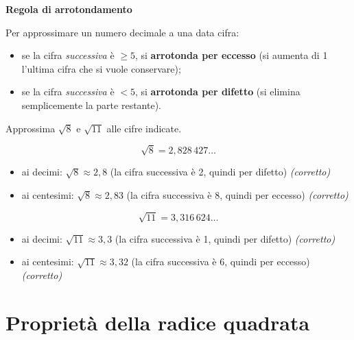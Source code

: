 \begin{regola}
    \textbf{Regola di arrotondamento}

    Per approssimare un numero decimale a una data cifra:
    \begin{itemize}
        \item se la cifra \emph{successiva} è \(\geq 5\), si \textbf{arrotonda per eccesso}
              (si aumenta di 1 l'ultima cifra che si vuole conservare);
        \item se la cifra \emph{successiva} è \(< 5\), si \textbf{arrotonda per difetto}
              (si elimina semplicemente la parte restante).
    \end{itemize}
\end{regola}

\begin{esempio}
    Approssima \(\sqrt{8}\) e \(\sqrt{11}\) alle cifre indicate.

    \[
        \sqrt{8} = 2{,}828\,427\ldots
    \]
    \begin{itemize}
        \item ai decimi: \(\sqrt{8} \approx 2{,}8\) \quad
              (la cifra successiva è 2, quindi per difetto) \quad \textit{(corretto)}
        \item ai centesimi: \(\sqrt{8} \approx 2{,}83\) \quad
              (la cifra successiva è 8, quindi per eccesso) \quad \textit{(corretto)}
    \end{itemize}

    \[
        \sqrt{11} = 3{,}316\,624\ldots
    \]
    \begin{itemize}
        \item ai decimi: \(\sqrt{11} \approx 3{,}3\) \quad
              (la cifra successiva è 1, quindi per difetto) \quad \textit{(corretto)}
        \item ai centesimi: \(\sqrt{11} \approx 3{,}32\) \quad
              (la cifra successiva è 6, quindi per eccesso) \quad \textit{(corretto)}
    \end{itemize}
\end{esempio}

\section{Proprietà della radice quadrata}

